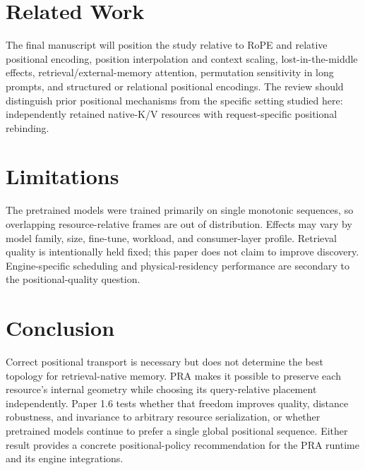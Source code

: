 \documentclass[10pt]{article}
\begin{document}
\section{Related Work}
The final manuscript will position the study relative to RoPE and relative positional encoding, position interpolation and context scaling, lost-in-the-middle effects, retrieval/external-memory attention, permutation sensitivity in long prompts, and structured or relational positional encodings. The review should distinguish prior positional mechanisms from the specific setting studied here: independently retained native-K/V resources with request-specific positional rebinding.

\section{Limitations}
The pretrained models were trained primarily on single monotonic sequences, so overlapping resource-relative frames are out of distribution. Effects may vary by model family, size, fine-tune, workload, and consumer-layer profile. Retrieval quality is intentionally held fixed; this paper does not claim to improve discovery. Engine-specific scheduling and physical-residency performance are secondary to the positional-quality question.

\section{Conclusion}
Correct positional transport is necessary but does not determine the best topology for retrieval-native memory. PRA makes it possible to preserve each resource's internal geometry while choosing its query-relative placement independently. Paper 1.6 tests whether that freedom improves quality, distance robustness, and invariance to arbitrary resource serialization, or whether pretrained models continue to prefer a single global positional sequence. Either result provides a concrete positional-policy recommendation for the PRA runtime and its engine integrations.
\end{document}
